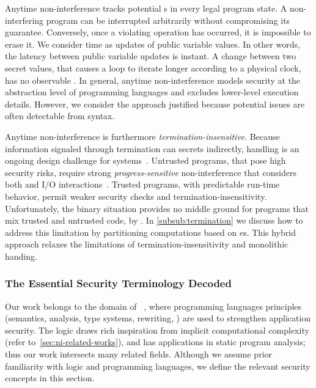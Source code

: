 Anytime non-interference tracks potential
 s in every legal program state. A
non-interfering program can be interrupted arbitrarily without compromising its
 guarantee. Conversely, once a violating
operation has occurred, it is impossible to erase it. We consider time as
updates of public variable values. In other words, the latency between public
variable updates is instant. A change between two secret values, that causes a
loop to iterate longer according to a physical clock, has no observable
. In general, anytime
non-interference models security at the
abstraction level of programming languages and excludes lower-level execution
details. However, we consider the approach justified because potential
 issues are often detectable from syntax.
 
Anytime non-interference is furthermore
\emph{termination-insensitive}.
Because information signaled through termination can  secrets
indirectly,  handling is an ongoing design challenge for
 systems~\cite{bay2020}. Untrusted programs, that pose
high security risks, require strong \emph{progress-sensitive}
non-interference that considers both
 and I/O interactions~\cite{hedin2012}. Trusted programs, with
predictable run-time behavior, permit weaker security checks and
termination-insensitivity.
Unfortunately, the binary situation provides no middle ground for programs that
mix trusted and untrusted code, \eg by . In
\autoref{subsub:termination} we discuss how to address this limitation by
partitioning computations based on es. This hybrid approach
relaxes the limitations of
termination-insensitivity and
monolithic  handing.

\subsubsection{The Essential Security Terminology Decoded}
\label{subsubsec:ni-terms}

Our work belongs to the domain of \emph{}~\cite{schneider2001,sabelfeld2003}, where programming languages
principles (semantics, analysis, type systems, rewriting, \etc) are used to
strengthen application security. The \lname logic draws rich inspiration from
implicit computational complexity (refer to~\autoref{sec:ni-related-works}), and
has applications in static program analysis; thus our work intersects many
related fields. Although we assume prior familiarity with logic and programming
languages, we define the relevant security concepts in this section.

